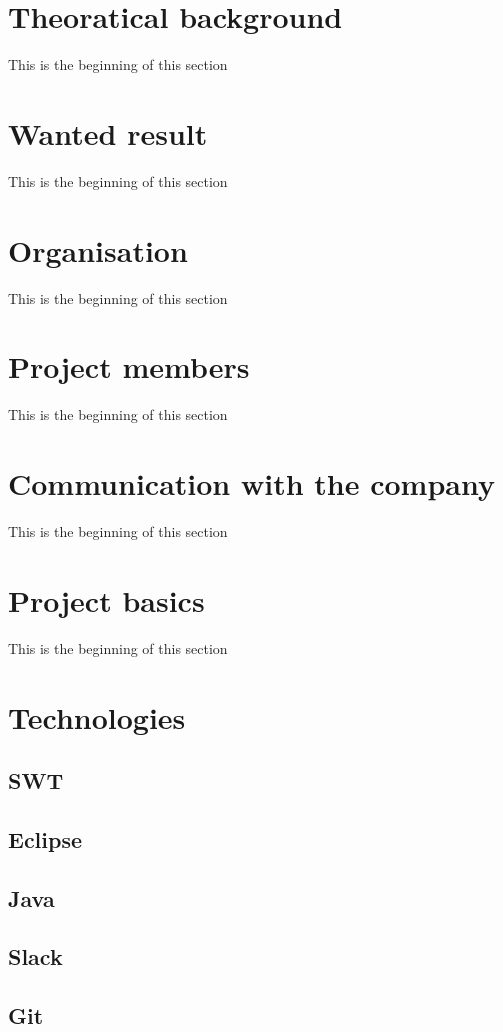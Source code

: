 \documentclass[11pt]{scrartcl}
\begin{document}
    \section{Theoratical background}
        This is the beginning of this section

    \section{Wanted result}
        This is the beginning of this section
    \section{Organisation}
        This is the beginning of this section

    \section{Project members}
        This is the beginning of this section

    \section{Communication with the company}
        This is the beginning of this section

    \section{Project basics}
        This is the beginning of this section

    \section{Technologies}

        \subsection{SWT}

        \subsection{Eclipse}

        \subsection{Java}

        \subsection{Slack}

        \subsection{Git}
\end{document}
